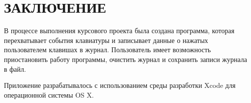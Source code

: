 \section*{ЗАКЛЮЧЕНИЕ}

В процессе выполнения курсового проекта была создана программа, которая
перехватывает события клавиатуры и записывает данные о нажатых
пользователем клавишах в журнал. Пользователь имеет возможность
приостановить работу программы, очистить журнал и сохранить записи журнала в
файл.

Приложение разрабатывалось с использованием среды разработки Xcode для
операционной системы OS X.

\pagebreak
